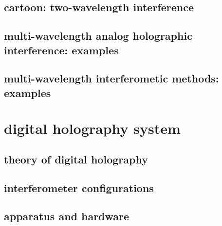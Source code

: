 \documentclass[t, aspectratio=169]{beamer}
\begin{document}
\subsection{cartoon: two-wavelength interference}



\subsection{multi-wavelength analog holographic interference: examples}



\subsection{multi-wavelength interferometic methods: examples}





\section{digital holography system}
\begin{frame}{\secname}
	\tableofcontents[currentsection, hideothersubsections, sectionstyle=hide/hide]
\end{frame}


\subsection{theory of digital holography}



\subsection{interferometer configurations}



\subsection{apparatus and hardware}
\end{document}
